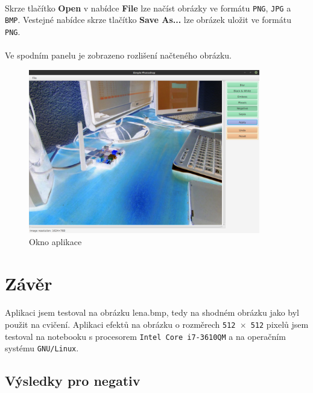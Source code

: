 \documentclass[12pt]{scrartcl}
\begin{document}
\paragraph{}
Skrze tlačítko \textbf{Open} v nabídce \textbf{File} lze načíst obrázky ve formátu \texttt{PNG}, \texttt{JPG} a \texttt{BMP}. Ve\nobreakspace stejné nabídce skrze tlačítko \textbf{Save As...} lze obrázek uložit ve formátu \texttt{PNG}.

\paragraph{}
Ve spodním panelu je zobrazeno rozlišení načteného obrázku.

\begin{figure}[!ht]
	\centering
	\label{obr:aplikace}
	\includegraphics[width=0.9\textwidth,natwidth=1,natheight=1]{app_gui.pdf}
	\caption{Okno aplikace}
\end{figure}	

\newpage
\section{Závěr}
\paragraph{}
Aplikaci jsem testoval na obrázku \textsf{lena.bmp}, tedy na shodném obrázku jako byl použit na cvičení. Aplikaci efektů na obrázku o rozměrech \texttt{512 $\times$ 512} pixelů jsem testoval na notebooku s procesorem \texttt{Intel Core i7-3610QM} a na operačním systému \texttt{GNU/Linux}.

\subsection{Výsledky pro negativ}
\end{document}
